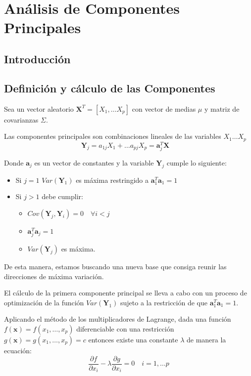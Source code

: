 \section{Análisis de Componentes Principales}
\subsection{Introducción}

%

\subsection{Definición y cálculo de las Componentes}

\noindent Sea un vector aleatorio $\textbf{X}^T=[X_1,\ldots X_p]$ con vector de medias $\mu$ y matriz de covarianzas $\Sigma$.
\begin{defi}
Las componentes principales son combinaciones lineales de las variables $X_1 \ldots X_p$
\begin{equation}
\textbf{Y}_j=a_{1j}X_1+\ldots a_{pj}X_p=\textbf{a}_j^T\textbf{X}\quad 
\end{equation}

\noindent Donde $\textbf{a}_j$ es un vector de constantes y la variable $\textbf{Y}_j$ cumple lo siguiente:
\begin{itemize}
\item Si $j=1$ $Var(\textbf{Y}_1)$ es máxima restringido a $\textbf{a}_1^T \textbf{a}_1=1$
\item Si $j>1$ debe cumplir:
\begin{itemize}
\item $Cov(\textbf{Y}_j,\textbf{Y}_i)=0\quad \forall i<j $
\item $\textbf{a}_j^T \textbf{a}_j=1$
\item $Var(\textbf{Y}_j)$ es máxima. 
\end{itemize}

\end{itemize}

\noindent De esta manera, estamos buscando una nueva base que consiga reunir las direcciones de máxima variación. 
\end{defi}

\noindent El cálculo de la primera componente principal se lleva a cabo con un proceso de optimización de la función $Var(\textbf{Y}_1)$ sujeto a la restricción de que $\textbf{a}_1^T\textbf{a}_1=1$. 

\noindent Aplicando el método de los multiplicadores de Lagrange,  dada una función $f(\textbf{x})=f(x_1,\ldots, x_p)$ diferenciable con una restricción $g(\textbf{x})=g(x_1, \ldots, x_p)=c$ entonces existe una constante $\lambda$ de manera la ecuación:
\begin{equation}
\dfrac{\partial f}{\partial x_i}-\lambda\dfrac{\partial g}{\partial x_i}=0 \quad i=1,\ldots p 
\end{equation}

